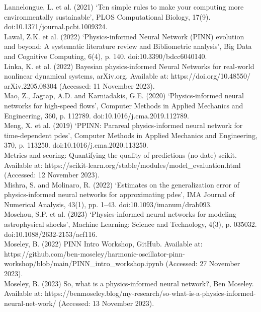 \documentclass[12pt, openany]{book}
\begin{document}
Lannelongue, L. et al. (2021) ‘Ten simple rules to make your computing more environmentally sustainable’, PLOS Computational Biology, 17(9). doi:10.1371/journal.pcbi.1009324. \\

Lawal, Z.K. et al. (2022) ‘Physics-informed Neural Network (PINN) evolution and beyond: A systematic literature review and Bibliometric analysis’, Big Data and Cognitive Computing, 6(4), p. 140. doi:10.3390/bdcc6040140. \\

Linka, K. et al. (2022) Bayesian physics-informed Neural Networks for real-world nonlinear dynamical systems, arXiv.org. Available at: https://doi.org/10.48550/\\arXiv.2205.08304 (Accessed: 11 November 2023). \\

Mao, Z., Jagtap, A.D. and Karniadakis, G.E. (2020) ‘Physics-informed neural networks for high-speed flows’, Computer Methods in Applied Mechanics and Engineering, 360, p. 112789. doi:10.1016/j.cma.2019.112789. \\

Meng, X. et al. (2019) ‘PPINN: Parareal physics-informed neural network for time-dependent pdes’, Computer Methods in Applied Mechanics and Engineering, 370, p. 113250. doi:10.1016/j.cma.2020.113250. \\

Metrics and scoring: Quantifying the quality of predictions (no date) scikit. Available at: https://scikit-learn.org/stable/modules/model{\_}evaluation.html (Accessed: 12 November 2023). \\

Mishra, S. and Molinaro, R. (2022) ‘Estimates on the generalization error of physics-informed neural networks for approximating pdes’, IMA Journal of Numerical Analysis, 43(1), pp. 1–43. doi:10.1093/imanum/drab093. \\

Moschou, S.P. et al. (2023) ‘Physics-informed neural networks for modeling astrophysical shocks’, Machine Learning: Science and Technology, 4(3), p. 035032. doi:10.1088/2632-2153/acf116. \\

Moseley, B. (2022) PINN Intro Workshop, GitHub. Available at: https://github.com/ben-moseley/harmonic-oscillator-pinn-workshop/blob/main/PINN{\_}intro{\_}workshop.ipynb (Accessed: 27 November 2023). \\

Moseley, B. (2023) So, what is a physics-informed neural network?, Ben Moseley. Available at: https://benmoseley.blog/my-research/so-what-is-a-physics-informed-neural-net-work/ (Accessed: 13 November 2023). \\
\end{document}
